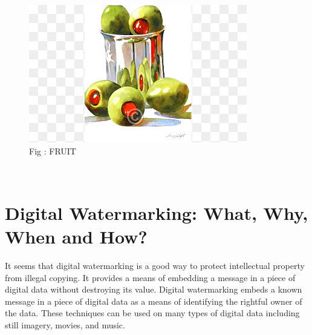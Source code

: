 \documentclass[12pt]{IEEEtran}
\begin{document}
\begin{subfigure}{\linewidth}
\includegraphics[width=\linewidth]{fruit}
\caption{Fig : FRUIT}
\end{subfigure}\\
\section*{Digital Watermarking: What, Why, When and How?}
It seems that digital watermarking is a good way to protect intellectual property from illegal copying. It provides a means of embedding a message in a piece of digital data without destroying its value. Digital watermarking embeds a known message in a piece of digital data as a means of identifying the rightful owner of the data. These techniques can be used on many types of digital data including still imagery, movies, and music.
\end{document}
